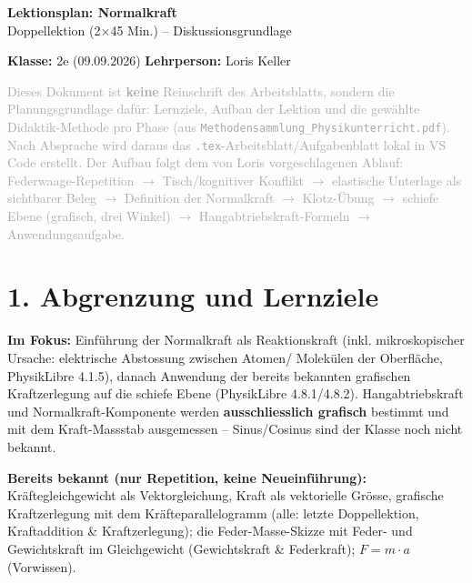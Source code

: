 \documentclass[11pt,a4paper]{article}
\begin{document}
\sloppy

\begin{center}
{\Huge\bfseries\color{titleblue}Lektionsplan: Normalkraft}\\[0.4em]
{\large Doppellektion (2$\times$45 Min.) -- Diskussionsgrundlage}
\end{center}
\vspace{0.5em}

\noindent\textbf{Klasse:} 2e (09.09.2026)
\noindent\textbf{Lehrperson:} Loris Keller

\vspace{0.3em}
\noindent\textcolor{darkgray}{Dieses Dokument ist \textbf{keine} Reinschrift des Arbeitsblatts, sondern die
Planungsgrundlage dafür: Lernziele, Aufbau der Lektion und die gewählte
Didaktik-Methode pro Phase (aus \texttt{Methodensammlung\_Physikunterricht.pdf}).
Nach Absprache wird daraus das \texttt{.tex}-Arbeitsblatt/Aufgabenblatt lokal in
VS Code erstellt. Der Aufbau folgt dem von Loris vorgeschlagenen Ablauf:
Federwaage-Repetition $\to$ Tisch/kognitiver Konflikt $\to$ elastische
Unterlage als sichtbarer Beleg $\to$ Definition der Normalkraft $\to$
Klotz-Übung $\to$ schiefe Ebene (grafisch, drei Winkel) $\to$
Hangabtriebskraft-Formeln $\to$ Anwendungsaufgabe.}

\section*{1. Abgrenzung und Lernziele}

\textbf{Im Fokus:} Einführung der Normalkraft als Reaktionskraft
(inkl. mikroskopischer Ursache: elektrische Abstossung zwischen Atomen/
Molekülen der Oberfläche, PhysikLibre 4.1.5), danach Anwendung der
bereits bekannten grafischen Kraftzerlegung auf die schiefe Ebene
(PhysikLibre 4.8.1/4.8.2). Hangabtriebskraft und Normalkraft-Komponente
werden \textbf{ausschliesslich grafisch} bestimmt und mit dem
Kraft-Massstab ausgemessen -- Sinus/Cosinus sind der Klasse noch nicht
bekannt.

\textbf{Bereits bekannt (nur Repetition, keine Neueinführung):}
Kräftegleichgewicht als Vektorgleichung, Kraft als vektorielle Grösse,
grafische Kraftzerlegung mit dem Kräfteparallelogramm (alle: letzte
Doppellektion, Kraftaddition \& Kraftzerlegung); die Feder-Masse-Skizze
mit Feder- und Gewichtskraft im Gleichgewicht (Gewichtskraft \&
Federkraft); $F=m\cdot a$ (Vorwissen).
\end{document}
